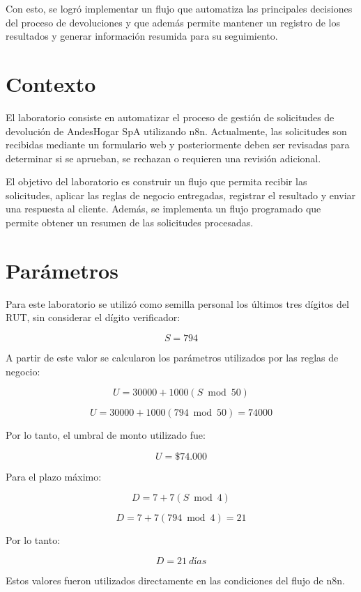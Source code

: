 \documentclass[11pt]{article}
\begin{document}
Con esto, se logró implementar un flujo que automatiza las principales decisiones del proceso de devoluciones y que además permite mantener un registro de los resultados y generar información resumida para su seguimiento.

\newpage




\section{Contexto}

El laboratorio consiste en automatizar el proceso de gestión de solicitudes de devolución de AndesHogar SpA utilizando n8n. Actualmente, las solicitudes son recibidas mediante un formulario web y posteriormente deben ser revisadas para determinar si se aprueban, se rechazan o requieren una revisión adicional.

El objetivo del laboratorio es construir un flujo que permita recibir las solicitudes, aplicar las reglas de negocio entregadas, registrar el resultado y enviar una respuesta al cliente. Además, se implementa un flujo programado que permite obtener un resumen de las solicitudes procesadas.

\section{Parámetros}

Para este laboratorio se utilizó como semilla personal los últimos tres dígitos del RUT, sin considerar el dígito verificador:

\[
S = 794
\]

A partir de este valor se calcularon los parámetros utilizados por las reglas de negocio:

\[
U = 30000 + 1000(S \bmod 50)
\]

\[
U = 30000 + 1000(794 \bmod 50) = 74000
\]

Por lo tanto, el umbral de monto utilizado fue:

\[
\boxed{U = \$74.000}
\]

Para el plazo máximo:

\[
D = 7 + 7(S \bmod 4)
\]

\[
D = 7 + 7(794 \bmod 4) = 21
\]

Por lo tanto:

\[
\boxed{D = 21\ días}
\]

Estos valores fueron utilizados directamente en las condiciones del flujo de n8n.
\end{document}
